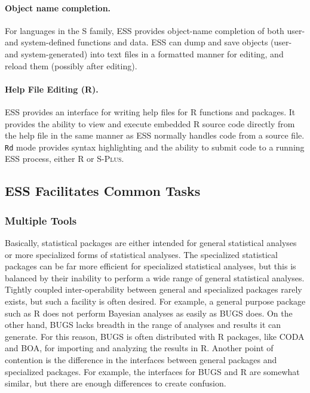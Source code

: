 \documentclass{article}
\newcommand*{\Splus}{\textsc{S-Plus}}
\newcommand{\stexttt}[1]{{\small\texttt{#1}}}
\begin{document}
\paragraph{Object name completion.}
For languages in the S family,
ESS provides object-name completion of both user- and
system-defined functions and data.  ESS can dump and save objects
(user- and system-generated) into text files in a formatted manner for
editing, and reload them (possibly after editing).

\paragraph{Help File Editing (R).}
ESS provides an interface for writing help files for R functions
and packages.  It provides the ability to view and execute embedded R
source code directly from the help file in the same manner as ESS
normally handles code from a source file.  \stexttt{Rd} mode provides
syntax highlighting and the ability to submit code to a running ESS
process, either R or \Splus.


\subsection{ESS Facilitates Common Tasks}
\label{sec:ess-facil-comm}

\subsubsection{Multiple Tools}
\label{sec:multiple-tools}

Basically, statistical packages are either intended for general
statistical analyses or more specialized forms of statistical analyses.
The specialized statistical packages can be far more efficient for
specialized statistical analyses, but this is balanced by their inability
to perform a wide range of general statistical analyses.  Tightly coupled
inter-operability between general and specialized packages rarely exists,
but such a facility is often desired.  For example, a general purpose
package such as R does not perform Bayesian analyses as easily as BUGS does.
On the other hand, BUGS lacks breadth in the range of analyses and results
it can generate.  For this reason, BUGS is often distributed with R packages,
like CODA and BOA, for importing and analyzing the results in R.  Another
point of contention is the difference in the interfaces between general
packages and specialized packages.  For example, the interfaces for BUGS
and R are somewhat similar, but there are enough differences to create confusion.
\end{document}
